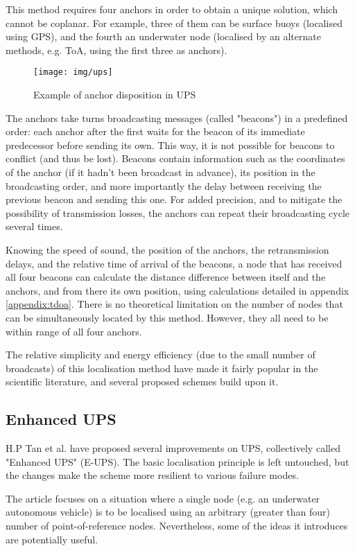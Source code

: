 \documentclass[12pt,a4paper,fleqn]{report}
\begin{document}
This method requires four anchors in order to obtain a unique solution, which cannot be coplanar. For example, three of them can be surface buoys (localised using GPS), and the fourth an underwater node (localised by an alternate methods, e.g. ToA, using the first three as anchors).

\begin{figure}[h]
	\centering
	\texttt{[image: img/ups]}
	\caption{%
	Example of anchor disposition in UPS
	}
\end{figure}

The anchors take turns broadcasting messages (called "beacons") in a predefined order: each anchor after the first waits for the beacon of its immediate predecessor before sending its own. This way, it is not possible for beacons to conflict (and thus be lost). Beacons contain information such as the coordinates of the anchor (if it hadn't been broadcast in advance), its position in the broadcasting order, and more importantly the delay between receiving the previous beacon and sending this one. For added precision, and to mitigate the possibility of transmission losses, the anchors can repeat their broadcasting cycle several times.

Knowing the speed of sound, the position of the anchors, the retransmission delays, and the relative time of arrival of the beacons, a node that has received all four beacons can calculate the distance difference between itself and the anchors, and from there its own position, using calculations detailed in appendix \ref{appendix:tdoa}. There is no theoretical limitation on the number of nodes that can be simultaneously located by this method. However, they all need to be within range of all four anchors.

The relative simplicity and energy efficiency (due to the small number of broadcasts) of this localisation method have made it fairly popular in the scientific literature, and several proposed schemes build upon it.

\subsection{Enhanced UPS}

H.P Tan et al. \cite{eups} have proposed several improvements on UPS, collectively called "Enhanced UPS" (E-UPS). The basic localisation principle is left untouched, but the changes make the scheme more resilient to various failure modes.

The article focuses on a situation where a single node (e.g. an underwater autonomous vehicle) is to be localised using an arbitrary (greater than four) number of point-of-reference nodes. Nevertheless, some of the ideas it introduces are potentially useful.
\end{document}

